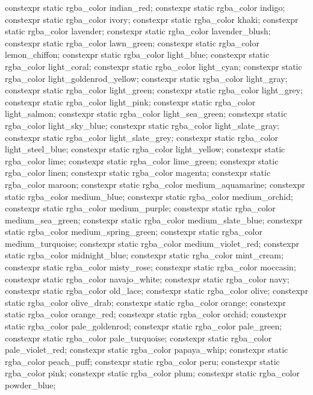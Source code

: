 \begin{codeblock}
{{    constexpr static rgba_color indian_red;
    constexpr static rgba_color indigo;
    constexpr static rgba_color ivory;
    constexpr static rgba_color khaki;
    constexpr static rgba_color lavender;
    constexpr static rgba_color lavender_blush;
    constexpr static rgba_color lawn_green;
    constexpr static rgba_color lemon_chiffon;
    constexpr static rgba_color light_blue;
    constexpr static rgba_color light_coral;
    constexpr static rgba_color light_cyan;
    constexpr static rgba_color light_goldenrod_yellow;
    constexpr static rgba_color light_gray;
    constexpr static rgba_color light_green;
    constexpr static rgba_color light_grey;
    constexpr static rgba_color light_pink;
    constexpr static rgba_color light_salmon;
    constexpr static rgba_color light_sea_green;
    constexpr static rgba_color light_sky_blue;
    constexpr static rgba_color light_slate_gray;
    constexpr static rgba_color light_slate_grey;
    constexpr static rgba_color light_steel_blue;
    constexpr static rgba_color light_yellow;
    constexpr static rgba_color lime;
    constexpr static rgba_color lime_green;
    constexpr static rgba_color linen;
    constexpr static rgba_color magenta;
    constexpr static rgba_color maroon;
    constexpr static rgba_color medium_aquamarine;
    constexpr static rgba_color medium_blue;
    constexpr static rgba_color medium_orchid;
    constexpr static rgba_color medium_purple;
    constexpr static rgba_color medium_sea_green;
    constexpr static rgba_color medium_slate_blue;
    constexpr static rgba_color medium_spring_green;
    constexpr static rgba_color medium_turquoise;
    constexpr static rgba_color medium_violet_red;
    constexpr static rgba_color midnight_blue;
    constexpr static rgba_color mint_cream;
    constexpr static rgba_color misty_rose;
    constexpr static rgba_color moccasin;
    constexpr static rgba_color navajo_white;
    constexpr static rgba_color navy;
    constexpr static rgba_color old_lace;
    constexpr static rgba_color olive;
    constexpr static rgba_color olive_drab;
    constexpr static rgba_color orange;
    constexpr static rgba_color orange_red;
    constexpr static rgba_color orchid;
    constexpr static rgba_color pale_goldenrod;
    constexpr static rgba_color pale_green;
    constexpr static rgba_color pale_turquoise;
    constexpr static rgba_color pale_violet_red;
    constexpr static rgba_color papaya_whip;
    constexpr static rgba_color peach_puff;
    constexpr static rgba_color peru;
    constexpr static rgba_color pink;
    constexpr static rgba_color plum;
    constexpr static rgba_color powder_blue;
}}
\end{codeblock}
